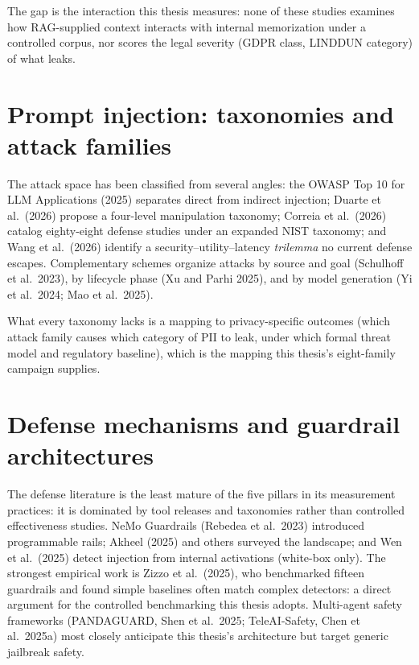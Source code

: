 \documentclass[12pt,a4paper]{report}
\begin{document}
The gap is the interaction this thesis measures: none of these studies examines how RAG-supplied
context interacts with internal memorization under a controlled corpus, nor scores the legal severity
(GDPR class, LINDDUN category) of what leaks.

\section{Prompt injection: taxonomies and attack families}
\label{sec:pi-taxonomy}

The attack space has been classified from several angles: the OWASP Top 10 for LLM Applications (2025)
separates direct from indirect injection; Duarte et al.\ (2026) propose a four-level manipulation
taxonomy; Correia et al.\ (2026) catalog eighty-eight defense studies under an expanded NIST
taxonomy; and Wang et al.\ (2026) identify a security--utility--latency \emph{trilemma} no current
defense escapes. Complementary schemes organize attacks by source and goal (Schulhoff et al.\ 2023), by
lifecycle phase (Xu and Parhi 2025), and by model generation (Yi et al.\ 2024; Mao et al.\ 2025).

What every taxonomy lacks is a mapping to privacy-specific outcomes (which attack family causes
which category of PII to leak, under which formal threat model and regulatory baseline), which is the
mapping this thesis's eight-family campaign supplies.

\section{Defense mechanisms and guardrail architectures}
\label{sec:defenses}

The defense literature is the least mature of the five pillars in its measurement practices: it is
dominated by tool releases and taxonomies rather than controlled effectiveness studies. NeMo Guardrails
(Rebedea et al.\ 2023) introduced programmable rails; Akheel (2025) and others surveyed the landscape;
and Wen et al.\ (2025) detect injection from internal activations (white-box only). The strongest
empirical work is Zizzo et al.\ (2025), who benchmarked fifteen guardrails and found simple baselines
often match complex detectors: a direct argument for the controlled benchmarking this thesis adopts.
Multi-agent safety frameworks (PANDAGUARD, Shen et al.\ 2025; TeleAI-Safety, Chen et al.\ 2025a) most
closely anticipate this thesis's architecture but target generic jailbreak safety.
\end{document}
